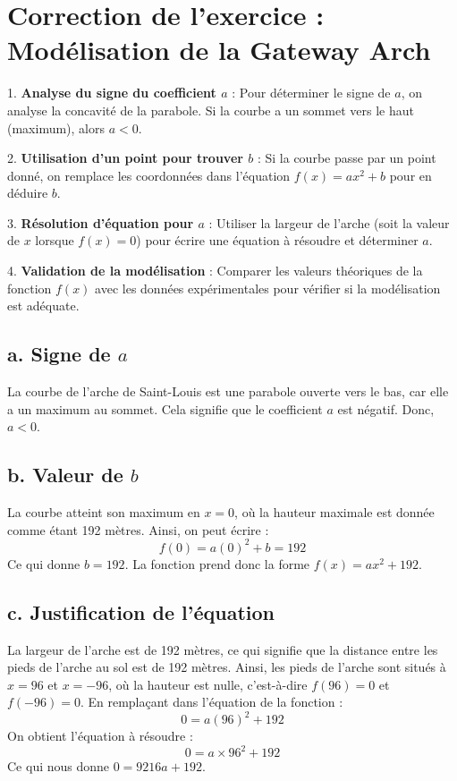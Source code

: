 \documentclass[a4paper, 12pt]{article}
\begin{document}
\section*{Correction de l'exercice : Modélisation de la Gateway Arch}

\begin{tcolorbox}[colback=yellow!10!white, colframe=yellow!50!black, title=Méthodes générales]
1. \textbf{Analyse du signe du coefficient \(a\)} : Pour déterminer le signe de \(a\), on analyse la concavité de la parabole. Si la courbe a un sommet vers le haut (maximum), alors \(a < 0\).

2. \textbf{Utilisation d'un point pour trouver \(b\)} : Si la courbe passe par un point donné, on remplace les coordonnées dans l'équation \(f(x) = ax^2 + b\) pour en déduire \(b\).

3. \textbf{Résolution d'équation pour \(a\)} : Utiliser la largeur de l'arche (soit la valeur de \(x\) lorsque \(f(x) = 0\)) pour écrire une équation à résoudre et déterminer \(a\).

4. \textbf{Validation de la modélisation} : Comparer les valeurs théoriques de la fonction \(f(x)\) avec les données expérimentales pour vérifier si la modélisation est adéquate.
\end{tcolorbox}

\subsection*{a. Signe de \(a\)}
La courbe de l’arche de Saint-Louis est une parabole ouverte vers le bas, car elle a un maximum au sommet. Cela signifie que le coefficient \(a\) est négatif. Donc, \(a < 0\).

\subsection*{b. Valeur de \(b\)}
La courbe atteint son maximum en \(x = 0\), où la hauteur maximale est donnée comme étant 192 mètres. Ainsi, on peut écrire :
\[
f(0) = a(0)^2 + b = 192
\]
Ce qui donne \(b = 192\). La fonction prend donc la forme \(f(x) = ax^2 + 192\).

\subsection*{c. Justification de l'équation}
La largeur de l’arche est de 192 mètres, ce qui signifie que la distance entre les pieds de l’arche au sol est de 192 mètres. Ainsi, les pieds de l’arche sont situés à \(x = 96\) et \(x = -96\), où la hauteur est nulle, c'est-à-dire \(f(96) = 0\) et \(f(-96) = 0\). En remplaçant dans l'équation de la fonction :
\[
0 = a(96)^2 + 192
\]
On obtient l’équation à résoudre :
\[
0 = a \times 96^2 + 192
\]
Ce qui nous donne \(0 = 9216a + 192\).
\end{document}
